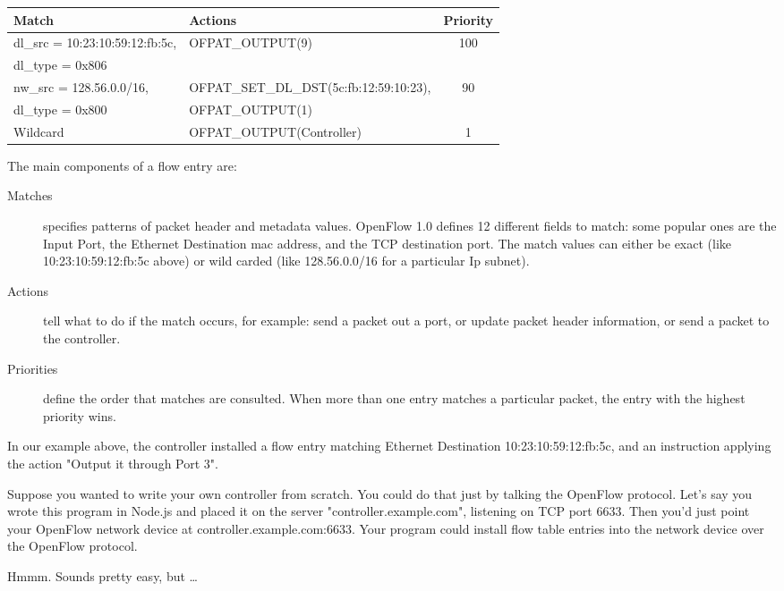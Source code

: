 \bigskip
\begin{tabularx}{6in}{|l|l|c|}
\hline\hline
Match & Actions & Priority
\\ \hline
dl\_src = 10:23:10:59:12:fb:5c, & OFPAT\_OUTPUT(9) & 100
\\
dl\_type = 0x806 & &  
\\ \hline
nw\_src = 128.56.0.0/16, & OFPAT\_SET\_DL\_DST(5c:fb:12:59:10:23), & 90 
\\
dl\_type = 0x800 & OFPAT\_OUTPUT(1) &
\\ \hline
Wildcard & OFPAT\_OUTPUT(Controller) & 1
\\ \hline\hline
\end{tabularx}

\bigskip

The main components of a flow entry are:

\begin{description}
\item[Matches] specifies patterns of packet header and metadata values.
OpenFlow 1.0 defines 12 different fields to match: some popular ones are the Input Port, 
the Ethernet Destination mac address, and the TCP destination port.
The match values can either be exact (like 10:23:10:59:12:fb:5c above) or wild carded (like 128.56.0.0/16 for a
particular Ip subnet).
\item[Actions] tell what to do if the match occurs,  
for example: send a packet out a port, or update packet header information, 
or send a packet to the controller. 
\item[Priorities] define the order that matches are consulted.  
When more than one entry matches a particular packet, the entry with the highest priority wins.
\end{description}

In our example above, the controller installed a flow entry matching Ethernet Destination 10:23:10:59:12:fb:5c, 
and an instruction applying the action "Output it through Port 3".

Suppose you wanted to write your own controller from scratch.  
You could do that just by talking the OpenFlow protocol.
Let's say you wrote this program in Node.js and placed it on the server "controller.example.com", 
listening on TCP port 6633.
Then you'd just point your OpenFlow network device at controller.example.com:6633.
Your program could install flow table entries into the network device over the OpenFlow protocol.

Hmmm.
Sounds pretty easy, but \ldots

